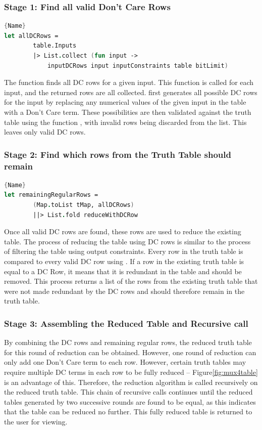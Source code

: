 \subsubsection{Stage 1: Find all valid Don't Care Rows}
\begin{lstlisting}[caption=Finding all DC Rows ,frame=tlrb, language=FSharp, label=lst:alldcrows]{Name}
let allDCRows =
        table.Inputs
        |> List.collect (fun input ->
            inputDCRows input inputConstraints table bitLimit)
\end{lstlisting}
The function  finds all DC rows for a given input. This function is called for each input, and the returned rows are all collected.  first generates all possible DC rows for the input by replacing any numerical values of the given input in the table with a Don't Care term. These possibilities are then validated against the truth table using the function , with invalid rows being discarded from the list. This leaves only valid DC rows.

\subsubsection{Stage 2: Find which rows from the Truth Table should remain}
\begin{lstlisting}[caption=Finding which regular rows should remain in the Truth Table ,frame=tlrb, language=FSharp, label=lst:regremain]{Name}
let remainingRegularRows =
        (Map.toList tMap, allDCRows)
        ||> List.fold reduceWithDCRow
\end{lstlisting}
Once all valid DC rows are found, these rows are used to reduce the existing table. The process of reducing the table using DC rows is similar to the process of filtering the table using output constraints. Every row in the truth table is compared to every valid DC row using . If a row in the existing truth table is equal to a DC Row, it means that it is redundant in the table and should be removed. This process returns a list of the rows from the existing truth table that were not made redundant by the DC rows and should therefore remain in the truth table.

\subsubsection{Stage 3: Assembling the Reduced Table and Recursive call}
By combining the DC rows and remaining regular rows, the reduced truth table for this round of reduction can be obtained. However, one round of reduction can only add one Don't Care term to each row. However, certain truth tables may require multiple DC terms in each row to be fully reduced -- Figure\ref{fig:mux4table} is an advantage of this. Therefore, the reduction algorithm is called recursively on the reduced truth table. This chain of recursive calls continues until the reduced tables generated by two successive rounds are found to be equal, as this indicates that the table can be reduced no further. This fully reduced table is returned to the user for viewing.

